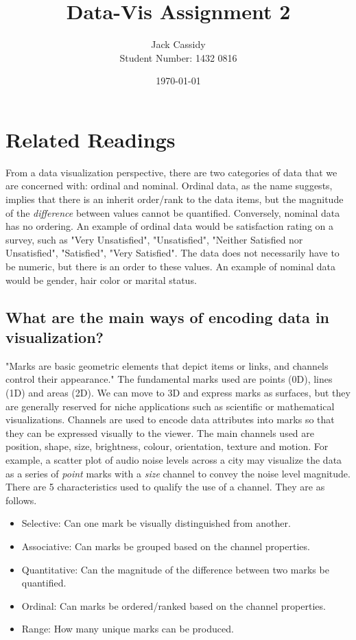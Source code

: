 \documentclass[12pt]{article}
\begin{document}
\title{Data-Vis Assignment 2}
\author{Jack Cassidy \\ Student Number: 1432 0816}
\date{\today}
\maketitle
\section{Related Readings}
From a data visualization perspective, there are two categories of data that we are concerned with: ordinal and nominal. Ordinal data, as the name suggests, implies that there is an inherit order/rank to the data items, but the magnitude of the \textit{difference} between values cannot be quantified. Conversely, nominal data has no ordering. An example of ordinal data would be satisfaction rating on a survey, such as "Very Unsatisfied", "Unsatisfied", "Neither Satisfied nor Unsatisfied", "Satisfied", "Very Satisfied". The data does not necessarily have to be numeric, but there is an order to these values. An example of nominal data would be gender, hair color or marital status.

\subsection{What are the main ways of encoding data in visualization?}
"Marks are basic geometric elements that depict items or links, and channels control their appearance." \cite{munzner} The fundamental marks used are points (0D), lines (1D) and areas (2D). We can move to 3D and express marks as surfaces, but they are generally reserved for niche applications such as scientific or mathematical visualizations. Channels are used to encode data attributes into marks so that they can be expressed visually to the viewer. The main channels used are position, shape, size, brightness, colour, orientation, texture and motion. For example, a scatter plot of audio noise levels across a city may visualize the data as a series of \textit{point} marks with a \textit{size} channel to convey the noise level magnitude. \\

There are 5 characteristics used to qualify the use of a channel. They are as follows.
\begin{itemize}
	\item Selective: Can one mark be visually distinguished from another.
	\item Associative: Can marks be grouped based on the channel properties.
	\item Quantitative: Can the magnitude of the difference between two marks be quantified.
	\item Ordinal: Can marks be ordered/ranked based on the channel properties.
	\item Range: How many unique marks can be produced.
\end{itemize}
\end{document}
